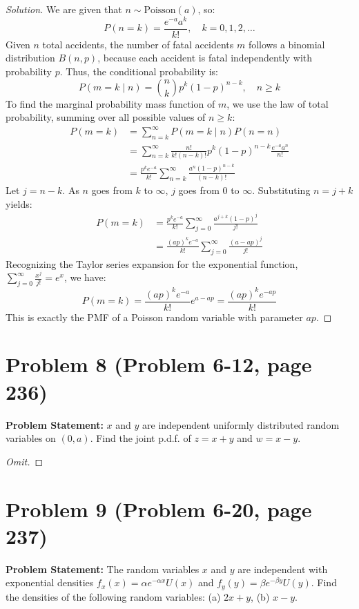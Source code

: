\documentclass{article}
\begin{document}
\begin{proof}[Solution]
	We are given that $n \sim \text{Poisson}(a)$, so:
	\[
		P(n = k) = \frac{e^{-a} a^k}{k!}, \quad k = 0, 1, 2, \dots
	\]
	Given $n$ total accidents, the number of fatal accidents $m$ follows a binomial distribution $B(n, p)$, because each accident is fatal independently with probability $p$. Thus, the conditional probability is:
	\[
		P(m = k \mid n) = \binom{n}{k} p^k (1-p)^{n-k}, \quad n \ge k
	\]
	To find the marginal probability mass function of $m$, we use the law of total probability, summing over all possible values of $n \ge k$:
	\begin{align*}
		P(m = k) &= \sum_{n=k}^{\infty} P(m = k \mid n) P(n = n) \\
		&= \sum_{n=k}^{\infty} \frac{n!}{k!(n-k)!} p^k (1-p)^{n-k} \frac{e^{-a} a^n}{n!} \\
		&= \frac{p^k e^{-a}}{k!} \sum_{n=k}^{\infty} \frac{a^n (1-p)^{n-k}}{(n-k)!}
	\end{align*}
	Let $j = n - k$. As $n$ goes from $k$ to $\infty$, $j$ goes from $0$ to $\infty$. Substituting $n = j + k$ yields:
	\begin{align*}
		P(m = k) &= \frac{p^k e^{-a}}{k!} \sum_{j=0}^{\infty} \frac{a^{j+k} (1-p)^j}{j!} \\
		&= \frac{(ap)^k e^{-a}}{k!} \sum_{j=0}^{\infty} \frac{(a - ap)^j}{j!}
	\end{align*}
	Recognizing the Taylor series expansion for the exponential function, $\sum_{j=0}^{\infty} \frac{x^j}{j!} = e^x$, we have:
	\[
		P(m = k) = \frac{(ap)^k e^{-a}}{k!} e^{a - ap} = \frac{(ap)^k e^{-ap}}{k!}
	\]
	This is exactly the PMF of a Poisson random variable with parameter $ap$.
\end{proof}

\vspace{1cm}

\section*{Problem 8 (Problem 6-12, page 236)}
\textbf{Problem Statement:}
$x$ and $y$ are independent uniformly distributed random variables on $(0, a)$. Find the joint p.d.f. of $z = x + y$ and $w = x - y$.

\begin{proof}[Omit]
\end{proof}

\vspace{1cm}

\section*{Problem 9 (Problem 6-20, page 237)}
\textbf{Problem Statement:}
The random variables $x$ and $y$ are independent with exponential densities $f_x(x) = \alpha e^{-\alpha x} U(x)$ and $f_y(y) = \beta e^{-\beta y} U(y)$. Find the densities of the following random variables: (a) $2x + y$, (b) $x - y$.
\end{document}
